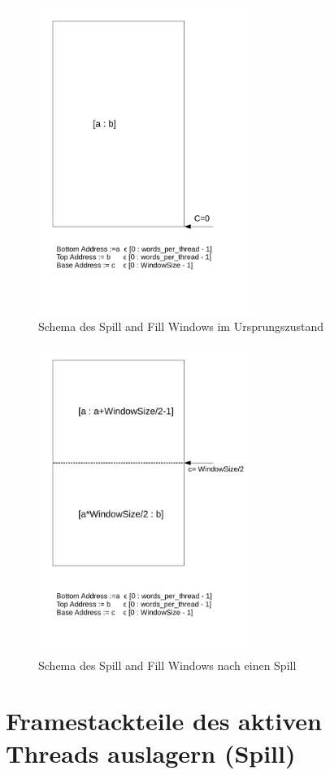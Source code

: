 \begin{figure}

	\includegraphics[height = 10cm]{PS_RS_graphics/SpillandFillWindow.pdf}
	\caption{Schema des Spill and Fill Windows im Ursprungszustand}

\end{figure}

\begin{figure}
	\includegraphics[height = 10cm]{PS_RS_graphics/SpillandFillWindownacheinenSpill.pdf}
	\caption{Schema des Spill and Fill Windows nach einen Spill}

\end{figure}


\section{Framestackteile des aktiven Threads auslagern (Spill)}

